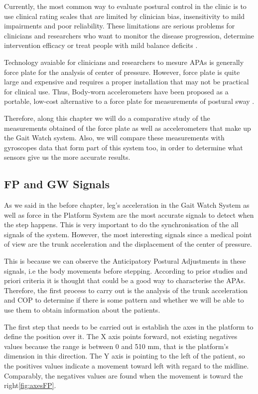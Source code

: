 Currently, the most common way to evaluate postural control in the clinic is to use clinical rating scales that are limited by clinician bias, insensitivity to mild impairments and poor reliability. These limitations are serious problems for clinicians and researchers who want to monitor the disease progression, determine intervention efficacy or treat people with mild balance deficits \cite{Mancini2012} .

Technology avaiable for clinicians and researchers to mesure APAs is generally force plate for the analysis of center of pressure. However, force plate is quite large and expensive and requires a proper installation that may not be practical for clinical use. Thus, Body-worn accelerometers have been proposed as a portable, low-cost alternative to a force plate for measurements of postural sway\cite{Mancini2012} .
 
Therefore, along this chapter we will do a comparative study of the measurements obtained of the force plate as well as accelerometers that make up the Gait Watch system. Also, we will compare these measurements with gyroscopes data that form part of this system too, in order to determine what sensors give us the more accurate results.

\subsection{FP and GW Signals}
As we said in the before chapter, leg's acceleration in the Gait Watch System as well as force in the Platform System are the most accurate signals to detect when the step happens. This is very important to do the synchronisation of the all signals of the system. However, the most interesting signals since a medical point of view are the trunk acceleration and the displacement of the center of pressure.

This is because we can observe the Anticipatory Postural Adjustments in these signals, i.e the body movements before stepping. According to prior studies and priori criteria it is thought that could be a good way to characterise the APAs.
Therefore, the first process to carry out is the analysis of the trunk acceleration and COP to determine if there is some pattern and whether we will be able to use them to obtain information about the patients.

The first step that needs to be carried out is establish the axes in the platform to define the position over it. The X axis points forward, not existing negatives values because the range is between 0 and 510 mm, that is the platform’s dimension in this direction. The Y axis is pointing to the left of the patient, so the positives values indicate a movement toward left with regard to the midline. Comparably, the negatives values are found when the movement is toward the right\ref{fig:axesFP}.

